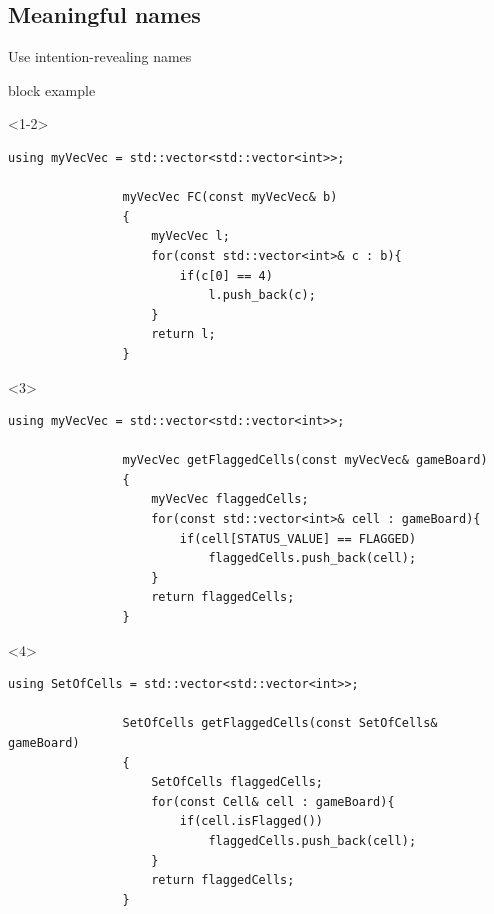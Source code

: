 
\subsection{Meaningful names}
\begin{frame}[fragile]{Use intention-revealing names}
    \vspace{-2mm}
    \begin{varblock}{block example}{}
        \begin{onlyenv}<1-2>
            \begin{lstlisting}[style=MyCpp]
                using myVecVec = std::vector<std::vector<int>>;

                myVecVec FC(const myVecVec& b)
                {
                    myVecVec l;
                    for(const std::vector<int>& c : b){
                        if(c[0] == 4)
                            l.push_back(c);
                    }
                    return l;
                }
            \end{lstlisting}
        \end{onlyenv}
        \begin{onlyenv}<3>
            \begin{lstlisting}[style=MyCpp]
                using myVecVec = std::vector<std::vector<int>>;

                myVecVec getFlaggedCells(const myVecVec& gameBoard)
                {
                    myVecVec flaggedCells;
                    for(const std::vector<int>& cell : gameBoard){
                        if(cell[STATUS_VALUE] == FLAGGED)
                            flaggedCells.push_back(cell);
                    }
                    return flaggedCells;
                }
            \end{lstlisting}
        \end{onlyenv}
        \begin{onlyenv}<4>
            \begin{lstlisting}[style=MyCpp]
                using SetOfCells = std::vector<std::vector<int>>;

                SetOfCells getFlaggedCells(const SetOfCells& gameBoard)
                {
                    SetOfCells flaggedCells;
                    for(const Cell& cell : gameBoard){
                        if(cell.isFlagged())
                            flaggedCells.push_back(cell);
                    }
                    return flaggedCells;
                }
            \end{lstlisting}
        \end{onlyenv}


\end{varblock}
\end{frame}
